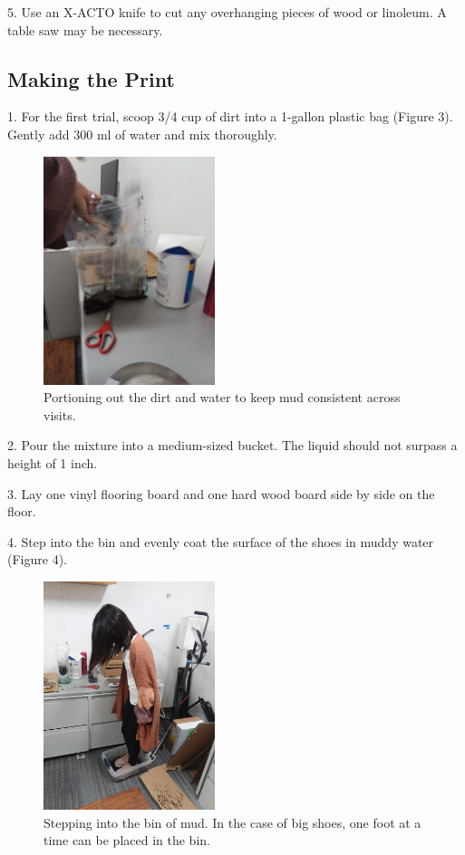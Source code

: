 \newpage

5. Use an X-ACTO knife to cut any overhanging pieces of wood or linoleum. A table saw may be necessary.


\subsection{Making the Print}

1. For the first trial, scoop 3/4 cup of dirt into a 1-gallon plastic bag (Figure 3). Gently add 300 ml of  water and mix thoroughly.

\begin{figure}[!htp]
\centering
\includegraphics[width=5cm]{Mud_Scoop}
\caption{Portioning out the dirt and water to keep mud consistent across visits. }
\label{Image 3}
\end{figure}

\newpage

2. Pour the mixture into a medium-sized bucket. The liquid should not surpass a height of 1 inch.

3. Lay one vinyl flooring board and one hard wood board side by side on the floor. 

4. Step into the bin and evenly coat the surface of the shoes in muddy water (Figure 4).

\begin{figure}[!htp]
\centering
\includegraphics[width=5cm]{Mud_Bin}
\caption{Stepping into the bin of mud. In the case of big shoes, one foot at a time can be placed in the bin. }
\label{Image 4}
\end{figure}


